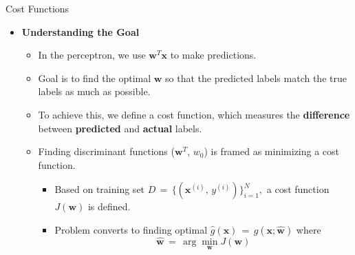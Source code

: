 \documentclass[serif, aspectratio=169]{beamer}
\begin{document}
\begin{frame}{Cost Functions}
    \begin{itemize}
        \item \textbf{Understanding the Goal}
        \medskip
        \begin{itemize}\itemsep1em
            \item In the perceptron, we use \( \mathbf{w}^T \mathbf{x} \) to make predictions.
            \item Goal is to find the optimal \(\mathbf{w}\) so that the predicted labels match the true labels as much as possible.
            \item To achieve this, we define a cost function, which measures the \textbf{difference} between \textbf{predicted} and \textbf{actual} labels.
            \item Finding discriminant functions (\(\mathbf{w}^T\), \(w_0\)) is framed as minimizing a cost function.
            \smallskip
            \begin{itemize}\itemsep0.8em
                \item Based on training set \(D \, = \, \{(\mathbf{x}^{(i)},\, y^{(i)})\}^N_{i=1},\) a cost function \(J(\mathbf{w})\) is defined.
                \item Problem converts to finding optimal \(\hat{g}(\mathbf{x}) \, = \, g(\mathbf{x; \hat{w}})\) where \[\mathbf{\hat{w}} \, = \, \arg \min_{\mathbf{w}}J(\mathbf{w})\]
            \end{itemize}
        \end{itemize}
    \end{itemize}
\end{frame}
\end{document}
